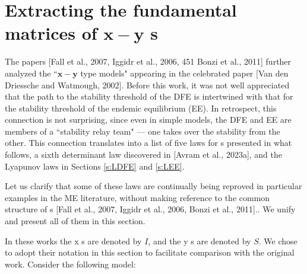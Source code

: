 \iffalse
\def\y{S} \def\x{I} \def\ye{\bar{S}}\def\xe{\bar{I}}

\section{Extracting the fundamental matrices of $\mathbf{x}-\mathbf{y}$ \ABP s} 

The papers  [Fall et al., 2007, Iggidr et al., 2006,
451
Bonzi et al., 2011]  further analyzed the ``$\mathbf{x}-\mathbf{y}$ type models" appearing in the celebrated paper  [Van den Driessche and Watmough, 2002]. Before this work, it was not well appreciated that the path to the stability threshold of the DFE is intertwined with that for the stability threshold of the endemic equilibrium (EE). In retrospect, this connection is not surprising, since even in simple models, the DFE and EE are members of a ``stability relay team" --- one takes over the stability from the other. This connection translates into a list of five laws for \ABa s presented in what follows, a sixth determinant law discovered in  [Avram et al., 2023a], and the Lyapunov laws in Sections \ref{s:LDFE} and \ref{s:LEE}.

 Let us clarify that some of these laws are continually being reproved in particular examples in the ME literature, without making reference to the common structure of \ABP s [Fall et al., 2007, Iggidr et al., 2006, Bonzi et al., 2011].. We unify and present all of them in this section.

 In these works the x \com s are denoted by $I$, and the y \com s are denoted by $S$. We chose to adopt their notation in this section %
to facilitate comparison with the original work. Consider the following model:

